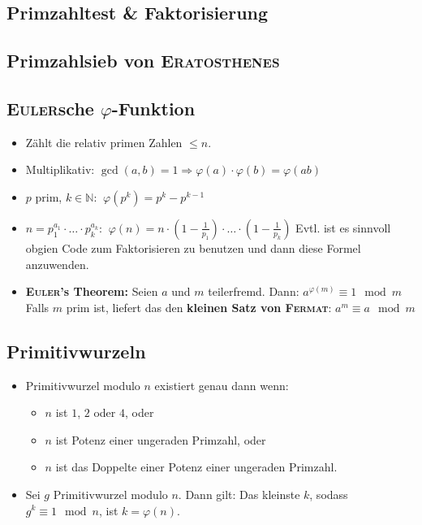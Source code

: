 \subsection{Primzahltest \& Faktorisierung}


\subsection{Primzahlsieb von \textsc{Eratosthenes}}


\subsection{\textsc{Euler}sche $\varphi$-Funktion}
\begin{itemize}[nosep]
	\item Zählt die relativ primen Zahlen $\leq n$.

	\item Multiplikativ:
	$\gcd(a,b) = 1 \Longrightarrow \varphi(a) \cdot \varphi(b) = \varphi(ab)$

	\item $p$ prim, $k \in \mathbb{N}$:
	$~\varphi(p^k) = p^k - p^{k - 1}$

	\item $n = p_1^{a_1} \cdot \ldots \cdot p_k^{a_k}$:
	$~\varphi(n) = n \cdot \left(1 - \frac{1}{p_1}\right) \cdot \ldots \cdot \left(1 - \frac{1}{p_k}\right)$
	Evtl. ist es sinnvoll obgien Code zum Faktorisieren zu benutzen und dann diese Formel anzuwenden.

	\item \textbf{\textsc{Euler}'s Theorem:}
	Seien $a$ und $m$ teilerfremd. Dann:
	$a^{\varphi(m)} \equiv 1 \mod m$\newline
	Falls $m$ prim ist, liefert das den \textbf{kleinen Satz von \textsc{Fermat}}:
	$a^{m} \equiv a \mod m$
\end{itemize}


\subsection{Primitivwurzeln}
\begin{itemize}[nosep]
	\item Primitivwurzel modulo $n$ existiert genau dann wenn:
	\begin{itemize}[nosep]
		\item $n$ ist $1$, $2$ oder $4$, oder
		\item $n$ ist Potenz einer ungeraden Primzahl, oder
		\item $n$ ist das Doppelte einer Potenz einer ungeraden Primzahl.
	\end{itemize}

	\item Sei $g$ Primitivwurzel modulo $n$.
	Dann gilt:\newline
	Das kleinste $k$, sodass $g^k \equiv 1 \mod n$, ist $k = \varphi(n)$.
\end{itemize}


